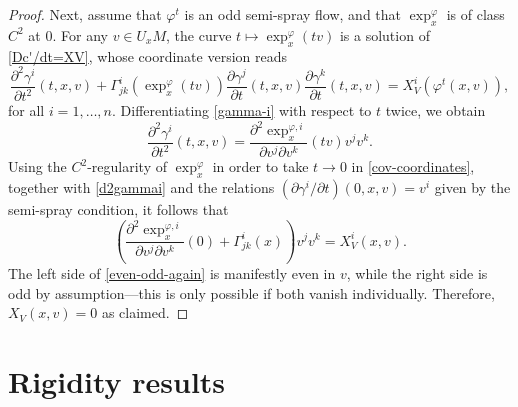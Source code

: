 \documentclass[10pt,a4paper]{amsart}
\numberwithin{equation}{section}
\theoremstyle{definition}
\begin{document}
\begin{proof}
Next, assume that $\varphi^t$ is an odd semi-spray flow, and that $\exp_x^{\varphi}$ is of class $C^2$ at $0$.
For any $v\in U_xM$, the curve $t\mapsto \exp_x^{\varphi}(tv)$ is a solution of \eqref{Dc'/dt=XV}, whose coordinate version reads
\begin{equation}\label{cov-coordinates}
 \frac{\partial^2\gamma^i}{\partial t^2}(t,x,v) + \Gamma_{jk}^i(\exp_x^{\varphi}(tv)) \frac{\partial\gamma^j}{\partial t}(t,x,v)\frac{\partial \gamma^k}{\partial t}(t,x,v) = X^i_V(\varphi^t(x,v)),
\end{equation}for all $i=1,\ldots, n$. Differentiating \eqref{gamma-i} with respect to $t$ twice, we obtain
\begin{equation}\label{d2gammai}
 \frac{\partial^2\gamma^i}{\partial t^2}(t,x,v) =
\frac{\partial^2 \exp_x^{\varphi,i}}{\partial v^j\partial v^k}(tv)v^jv^k.\end{equation}Using the $C^2$-regularity of $\exp_x^{\varphi}$ in order to take $t\to 0$ in \eqref{cov-coordinates}, together with \eqref{d2gammai} and the relations $(\partial \gamma^i/\partial t)(0,x,v) = v^i$ given by the semi-spray condition, it follows that
\begin{equation}\label{even-odd-again}
\left( \frac{\partial^2 \exp_x^{\varphi,i}}{\partial v^j\partial v^k}(0)+\Gamma^i_{jk}(x)\right)v^jv^k= X^i_V(x,v).
\end{equation}The left side of \eqref{even-odd-again} is manifestly even in $v$, while the right side is odd by assumption---this is only possible if both vanish individually. Therefore, $X_V(x,v)=0$ as claimed.
\end{proof}


\section{Rigidity results}\label{sec:rigidity}
\end{document}

